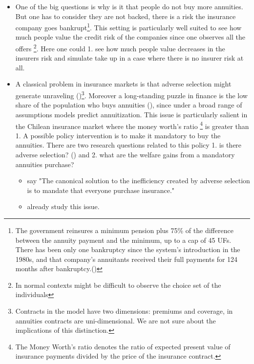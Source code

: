\documentclass[12pt]{article}
\theoremstyle{plain}
\theoremstyle{plain}
\begin{document}
\begin{itemize}
    \item One of the big questions is why is it that people do not buy more annuities. But one has to consider they are not backed, there is a risk the insurance company goes bankrupt\footnote{The government reinsures a minimum pension plus 75\% of the difference between the annuity payment and the minimum, up to a cap of 45 UFs. There has been only one bankruptcy since the system’s introduction in the 1980s, and that company’s annuitants received their full payments for 124 months after bankruptcy.(\cite{illanes_retirement_2019})}. This setting is particularly well suited to see how much people value the credit risk of the companies since one observes all the offers \footnote{In normal contexts might be difficult to observe the choice set of the individuals}. Here one could 1. see how much people value decreases in the insurers risk and simulate take up in a case where there is no insurer risk at all. 

    \item A classical problem in insurance markets is that adverse selection might generate unraveling (\cite{rothschild_equilibrium_1976})\footnote{Contracts in the \textcite{rothschild_equilibrium_1976} model have two dimensions: premiums and coverage, in annuities contracts are uni-dimensional. We are not sure about the implications of this distinction.}. Moreover a long-standing puzzle in finance is the low share of the population who buys annuities (\cite{modigliani_life_1986}), since under a broad range of assumptions models predict annuitization. This issue is particularly salient in the Chilean insurance market where the money worth's ratio \footnote{The Money Worth's ratio denotes the ratio of expected present value of insurance payments divided by the price of the insurance contract.} is greater than 1. A possible policy intervention is to make it mandatory to buy the annuities. There are two research questions related to this policy 1. is there adverse selection? (\cite{chiappori_testing_2000, einav_estimating_2010}) and 2. what are the welfare gains from a mandatory annuities purchase? 

    \begin{itemize}
        \item \textcite{einav_selection_2011} say "The canonical solution to the inefficiency created by adverse selection is to mandate that everyone purchase insurance."

        \item \textcite{illanes_retirement_2019} already study this issue. 
    \end{itemize}


\end{itemize}
\end{document}
